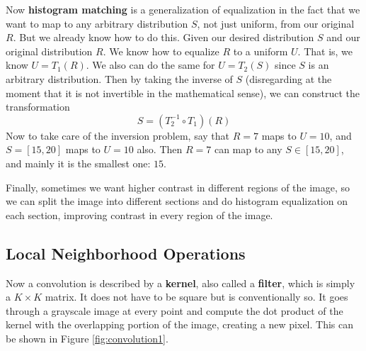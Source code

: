 \documentclass{article}
\begin{document}
    Now \textbf{histogram matching} is a generalization of equalization in the fact that we want to map to any arbitrary distribution $S$, not just uniform, from our original $R$. But we already know how to do this. Given our desired distribution $S$ and our original distribution $R$. We know how to equalize $R$ to a uniform $U$. That is, we know $U = T_1 (R)$. We also can do the same for $U = T_2 (S)$ since $S$ is an arbitrary distribution. Then by taking the inverse of $S$ (disregarding at the moment that it is not invertible in the mathematical sense), we can construct the transformation 
    \[S = (T_2^{-1} \circ T_1) (R)\]
    Now to take care of the inversion problem, say that $R = 7$ maps to $U = 10$, and $S = [15, 20]$ maps to $U = 10$ also. Then $R = 7$ can map to any $S \in [15, 20]$, and mainly it is the smallest one: $15$. 

    Finally, sometimes we want higher contrast in different regions of the image, so we can split the image into different sections and do histogram equalization on each section, improving contrast in every region of the image. 

  \subsection{Local Neighborhood Operations}

    Now a convolution is described by a \textbf{kernel}, also called a \textbf{filter}, which is simply a $K \times K$ matrix. It does not have to be square but is conventionally so. It goes through a grayscale image at every point and compute the dot product of the kernel with the overlapping portion of the image, creating a new pixel. This can be shown in Figure \ref{fig:convolution1}. 
\end{document}
